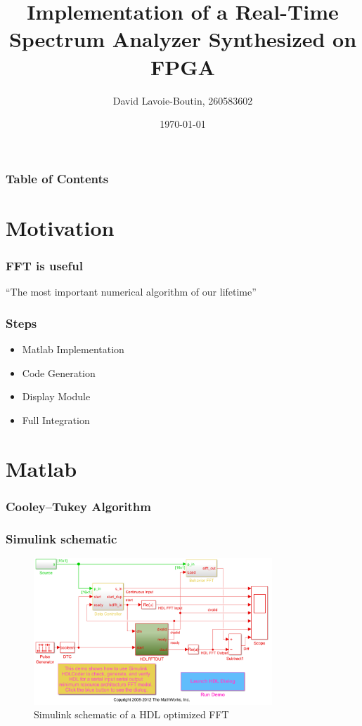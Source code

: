 \documentclass{beamer}
\title[Real-Time Spectrum Analyser~~~~~~~~~~~~~~~~~~~~~~~~~~~~~~~~~~\insertframenumber/\inserttotalframenumber]{Implementation of a Real-Time Spectrum Analyzer Synthesized on FPGA}
\author[David Lavoie-Boutin]{David Lavoie-Boutin, 260583602}
\date{\today}
\begin{document}
\frame{\titlepage}

\begin{frame}
\frametitle{Table of Contents}
\tableofcontents
\end{frame}

\section{Motivation}

\begin{frame}\frametitle{FFT is useful }

  \begin{exampleblock}{}
    {\large ``The most important numerical algorithm of our lifetime''}
    \vskip5mm
    \hspace*{}
  \end{exampleblock}
\end{frame}

\begin{frame}
  \frametitle{Steps}
  \begin{itemize}
    \item Matlab Implementation
    \item Code Generation
    \item Display Module
    \item Full Integration
  \end{itemize}
\end{frame}

\section{Matlab}

\begin{frame}
  \frametitle{Cooley–Tukey Algorithm}
  
\end{frame}

\begin{frame}
  
\end{frame}


\begin{frame}
  \frametitle{Simulink schematic}
  \begin{figure}[!htb]
    \centering
    \includegraphics[width=0.8\textwidth]{sim2.PNG}
    \caption{Simulink schematic of a HDL optimized FFT}
    \label{fig:simulink}
  \end{figure}
\end{frame}
\end{document}
